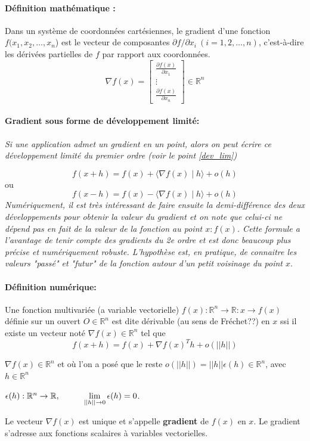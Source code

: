 		\paragraph*{Définition mathématique :} Dans un système de coordonnées cartésiennes, le gradient d'une fonction {$ f(x_{1},x_{2},\dots ,x_{n}$)} est le vecteur de composantes {$ \partial f/ \partial x_{i}\ (i=1,2,\dots ,n)$}, c'est-à-dire les dérivées partielles de $f$ par rapport aux coordonnées.
		$${\nabla f(x)={
				\begin{bmatrix}
					{\frac {\partial f(x)}{\partial x_{1}}}\\
					\vdots \\
					{\frac {\partial f(x)}{\partial x_{n}}}
				\end{bmatrix}}} \in \mathbb{R}^n $$
		\paragraph*{Gradient sous forme de développement limité:}
		\textit{Si une application admet un gradient en un point, alors on peut écrire ce développement limité du premier ordre (voir le point \ref{dev_lim})}
		
		$${ 
			f(x+h)=f(x)+\langle \nabla f(x)\mid h\rangle +o(h) 
		}$$ 
		ou 
		$$ {  
			f(x-h)=f(x)-\langle \nabla f(x)\mid h\rangle +o(h)
		}$$
		\textit{Numériquement, il est très intéressant de faire ensuite la demi-différence des deux développements pour obtenir la valeur du gradient et on note que celui-ci ne dépend pas en fait de la valeur de la fonction au point $x : f (x)$. Cette formule a l'avantage de tenir compte des gradients du 2e ordre et est donc beaucoup plus précise et numériquement robuste. L'hypothèse est, en pratique, de connaitre les valeurs "passé" et "futur" de la fonction autour d'un petit voisinage du point $x$}.\\
		\paragraph*{Définition numérique:}
		Une fonction multivariée (a variable vectorielle)
		$ f(x)	: \mathbb{R}^n \rightarrow \mathbb{R} : x \rightarrow f(x) $ définie sur un ouvert $O \in \mathbb{R}^n$ est dite dérivable (au sens de Fréchet??) en $x$ ssi il existe un vecteur noté $\nabla f(x) \in \mathbb{R}^n$ tel que
		\begin{equation}
			f(x+h) = f(x) + \nabla f(x)^{T}h + o(||h||)
		\end{equation}
		
		$\nabla f(x) \in \mathbb{R}^n$ et où l’on a posé que le reste $o(||h||) = ||h||\epsilon (h) \in \mathbb{R}^n$, avec $h \in \mathbb{R}^n$ 
		\begin{center}
			$\epsilon (h): \mathbb{R}^n\rightarrow \mathbb{R}, \hspace{1 cm} \lim\limits_{||h|| \rightarrow 0} \epsilon(h)=0$.
		\end{center} 
		Le vecteur $\nabla f(x)$ est unique et s’appelle \textbf{gradient} de $f(x)$ en $x$.
		Le gradient s’adresse aux fonctions scalaires à variables vectorielles.
